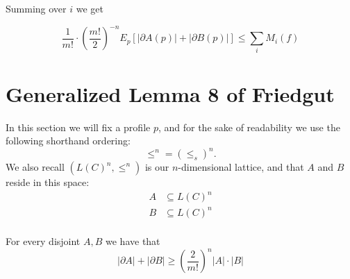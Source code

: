 	Summing over $i$ we get

	\begin{corollary}
		\[
			\frac{1}{m!} \cdot \left(\frac{m!}{2}\right)^{-n} E_p[|\partial A(p)| + |\partial B(p)|] \le \sum_i M_i(f)
		\]
	\end{corollary}


\section{Generalized Lemma 8 of Friedgut}

	In this section we will fix a profile $p$, and for the sake of readability we use the following shorthand ordering:
	\[
		\le^n = (\le_s)^n.
	\]
	We also recall $(L(C)^n, \le^n)$ is our $n$-dimensional lattice, and that $A$ and $B$ reside in this space:
	\begin{align*}
		A &\subseteq L(C)^n \\
		B &\subseteq L(C)^n \\
	\end{align*}

	\begin{lemma}
		\label{friedgut-lemma-8}
		For every disjoint $A, B$ we have that
		\[
			|\partial A| + |\partial B| \ge \left( \frac{2}{m!} \right)^n |A| \cdot |B|
		\]
	\end{lemma}

